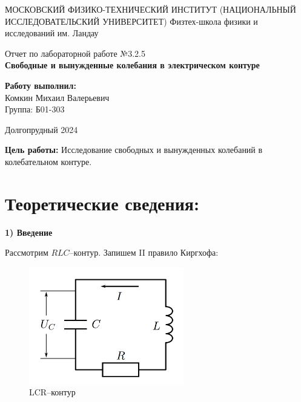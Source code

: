 \documentclass[a4paper, 12pt]{article}
\begin{document}
\begin{titlepage}
        \begin{center}
		{\large МОСКОВСКИЙ ФИЗИКО-ТЕХНИЧЕСКИЙ ИНСТИТУТ (НАЦИОНАЛЬНЫЙ ИССЛЕДОВАТЕЛЬСКИЙ УНИВЕРСИТЕТ)}
		{\large Физтех-школа физики и исследований им. Ландау}
	\end{center}
	
	
	\vspace{4.5cm}
	{\huge
		\begin{center}
			Отчет по лабораторной работе №3.2.5 \\
                \textbf{Свободные и вынужденные колебания в электрическом контуре}\\
		\end{center}
	}
	\vspace{2cm}
	\begin{flushright} %
		\begin{minipage}{0.3\textwidth} %
			\begin{flushleft} %

				\large\textbf{Работу выполнил:}\\
				\large {Комкин Михаил Валерьевич} \\
				\large {Группа: Б01-303} \\

			\end{flushleft}
		\end{minipage}
	\end{flushright}
	\vspace{8cm}
	\begin{center}
            
		Долгопрудный 2024
	\end{center}
\end{titlepage}

\textbf{Цель работы:}
Исследование свободных и вынужденных колебаний в колебательном контуре.

\section{Теоретические сведения:}

{\bf 1) Введение}

Рассмотрим $RLC$--контур. Запишем II правило Киргхофа:
\begin{figure}[h!]
    \centering
    \includegraphics[scale = 0.5]{LCR.png}
    \caption{LCR--контур}
\end{figure}
\end{document}
